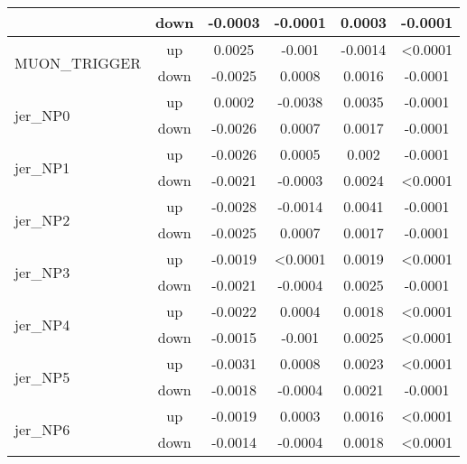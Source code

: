 \begin{table}[h!]
\begin{tabular}{lccccc}
                                       & down &     -0.0003     &     -0.0001     &     0.0003   &   -0.0001    \\ \hline
\multirow{2}{*}{MUON\_TRIGGER}      & up   &     0.0025     &     -0.001     &     -0.0014  & <0.0001      \\
                                       & down &     -0.0025     &     0.0008     &     0.0016   &   -0.0001    \\ \hline
\multirow{2}{*}{jer\_NP0}      & up   &     0.0002     &     -0.0038     &     0.0035  & -0.0001      \\
                                       & down &     -0.0026     &     0.0007     &     0.0017   &   -0.0001    \\ \hline
\multirow{2}{*}{jer\_NP1}      & up   &     -0.0026     &     0.0005     &     0.002  & -0.0001      \\
                                       & down &     -0.0021     &     -0.0003     &     0.0024   &   <0.0001    \\ \hline
\multirow{2}{*}{jer\_NP2}      & up   &     -0.0028     &     -0.0014     &     0.0041  & -0.0001      \\
                                       & down &     -0.0025     &     0.0007     &     0.0017   &   -0.0001    \\ \hline
\multirow{2}{*}{jer\_NP3}      & up   &     -0.0019     &     <0.0001     &     0.0019  & <0.0001      \\
                                       & down &     -0.0021     &     -0.0004     &     0.0025   &   -0.0001    \\ \hline
\multirow{2}{*}{jer\_NP4}      & up   &     -0.0022     &     0.0004     &     0.0018  & <0.0001      \\
                                       & down &     -0.0015     &     -0.001     &     0.0025   &   <0.0001    \\ \hline
\multirow{2}{*}{jer\_NP5}      & up   &     -0.0031     &     0.0008     &     0.0023  & <0.0001      \\
                                       & down &     -0.0018     &     -0.0004     &     0.0021   &   -0.0001    \\ \hline
\multirow{2}{*}{jer\_NP6}      & up   &     -0.0019     &     0.0003     &     0.0016  & <0.0001      \\
                                       & down &     -0.0014     &     -0.0004     &     0.0018   &   <0.0001    \\ \hline

\end{tabular}
\end{table}
